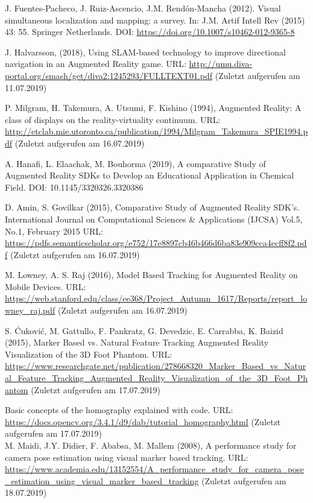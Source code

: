 \documentclass[12pt,oneside]{scrreprt}
\begin{document}
\begin{thebibliography}{10}
 J. Fuentes-Pacheco, J. Ruiz-Ascencio, J.M. Rendón-Mancha (2012). Visual simultaneous localization and mapping: a survey. In: J.M. Artif Intell Rev (2015) 43: 55. Springer Netherlands. DOI: \url{https://doi.org/10.1007/s10462-012-9365-8}

 J. Halvarsson, (2018), Using SLAM-based technology to improve directional navigation in an Augmented Reality game. URL: \url{http://umu.diva-portal.org/smash/get/diva2:1245293/FULLTEXT01.pdf} (Zuletzt aufgerufen am 11.07.2019)

 P. Milgram, H. Takemura, A. Utsumi, F. Kishino (1994), Augmented Reality: A class of displays on the reality-virtuality continuum. URL: \url{http://etclab.mie.utoronto.ca/publication/1994/Milgram_Takemura_SPIE1994.pdf} (Zuletzt aufgerufen am 16.07.2019)

 A. Hanafi, L. Elaachak, M. Bouhorma (2019), A comparative Study of Augmented Reality SDKs to Develop an Educational Application in Chemical Field. DOI: 10.1145/3320326.3320386

 D. Amin, S. Govilkar (2015), Comparative Study of Augmented Reality
SDK’s. International Journal on Computational Sciences \& Applications (IJCSA) Vol.5, No.1, February 2015 URL: \url{https://pdfs.semanticscholar.org/e752/17e8897cb46b466d6ba83e909cca4ecff8f2.pdf} (Zuletzt aufgerufen am 16.07.2019)

 M. Lowney, A. S. Raj (2016), Model Based Tracking for Augmented Reality
on Mobile Devices. URL: \url{https://web.stanford.edu/class/ee368/Project_Autumn_1617/Reports/report_lowney_raj.pdf} (Zuletzt aufgerufen am 16.07.2019)

 S. Ćuković, M. Gattullo, F. Pankratz, G. Devedzic, E. Carrabba, K. Baizid (2015), Marker Based vs. Natural Feature Tracking Augmented Reality Visualization of the 3D Foot Phantom. URL: \url{https://www.researchgate.net/publication/278668320_Marker_Based_vs_Natural_Feature_Tracking_Augmented_Reality_Visualization_of_the_3D_Foot_Phantom} (Zuletzt aufgerufen am 17.07.2019)

 Basic concepts of the homography explained with code. URL: \url{https://docs.opencv.org/3.4.1/d9/dab/tutorial_homography.html} (Zuletzt aufgerufen am 17.07.2019) \\

 M. Maidi, J.Y. Didier, F. Ababsa, M. Mallem (2008), A performance study for camera pose estimation using visual marker based tracking. URL: \url{https://www.academia.edu/13152554/A_performance_study_for_camera_pose_estimation_using_visual_marker_based_tracking}
(Zuletzt aufgerufen am 18.07.2019)


\end{thebibliography}
\end{document}
